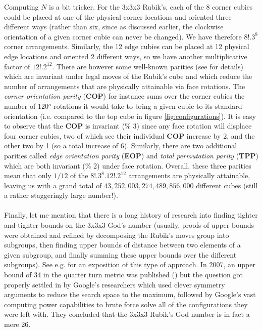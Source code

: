 Computing $N$ is a bit tricker. For the 3x3x3 Rubik's, each of the 8 corner cubies could be placed at one of the physical corner locations and oriented three different ways (rather than six, since as discussed earlier, the clockwise orientation of a given corner cubie can never be changed). We have therefore $8! . 3^{8}$ corner arrangements. Similarly, the 12 edge cubies can be placed at 12 physical edge locations and oriented 2 different ways, so we have another multiplicative factor of $12! . 2^{12}$. There are however some well-known parities (see \cite{Schoenert} for details) which are invariant under legal moves of the Rubik's cube and which reduce the number of arrangements that are physically attainable via face rotations. The \textit{corner orientation parity} (\textbf{COP}) for instance sums over the corner cubies the number of 120$^{o}$ rotations it would take to bring a given cubie to its standard orientation (i.e. compared to the top cube in figure \ref{fig:configurations}). It is easy to observe that the \textbf{COP} is invariant (\% 3) since any face rotation will displace four corner cubies, two of which see their individual \textbf{COP} increase by 2, and the other two by 1 (so a total increase of 6). Similarly, there are two additional parities called \textit{edge orientation parity} (\textbf{EOP}) and \textit{total permutation parity} (\textbf{TPP}) which are both invariant (\% 2) under face rotation. Overall, these three parities mean that only $1/12$ of the $8! . 3^{8} . 12! . 2^{12}$ arrangements are physically attainable, leaving us with a grand total of $43,252,003,274,489,856,000$ different cubes (still a rather staggeringly large number!).
\\
\\
Finally, let me mention that there is a long history of research into finding tighter and tighter bounds on the 3x3x3 God's number (usually, proofs of upper bounds were obtained and refined by decomposing the Rubik's moves group into subgroups, then finding upper bounds of distance between two elements of a given subgroup, and finally summing these upper bounds over the different subgroups). See e.g. \cite{RubiksChicago} for an exposition of this type of approach. In 2007, an upper bound of 34 in the quarter turn metric was published (\cite{RubiksRadu}) but the question got properly settled in \cite{RubiksGodNumber} by Google's researchers which used clever symmetry arguments to reduce the search space to the maximum, followed by Google's vast computing power capabilities to brute force solve all of the configurations they were left with. They concluded that the 3x3x3 Rubik's God number is in fact a mere 26.


